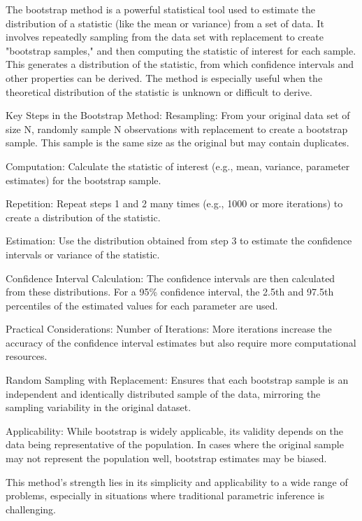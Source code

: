 \documentclass[17pt]{extarticle} %
\begin{document}
The bootstrap method is a powerful statistical tool used to estimate the distribution of a statistic (like the mean or variance) from a set of data. It involves repeatedly sampling from the data set with replacement to create "bootstrap samples," and then computing the statistic of interest for each sample. This generates a distribution of the statistic, from which confidence intervals and other properties can be derived. The method is especially useful when the theoretical distribution of the statistic is unknown or difficult to derive.

Key Steps in the Bootstrap Method:
Resampling: From your original data set of size
N, randomly sample 
N observations with replacement to create a bootstrap sample. This sample is the same size as the original but may contain duplicates.

Computation: Calculate the statistic of interest (e.g., mean, variance, parameter estimates) for the bootstrap sample.

Repetition: Repeat steps 1 and 2 many times (e.g., 1000 or more iterations) to create a distribution of the statistic.

Estimation: Use the distribution obtained from step 3 to estimate the confidence intervals or variance of the statistic.

Confidence Interval Calculation: The confidence intervals are then calculated from these distributions. For a 95\% confidence interval, the 2.5th and 97.5th percentiles of the estimated values for each parameter are used.

Practical Considerations:
Number of Iterations: More iterations increase the accuracy of the confidence interval estimates but also require more computational resources.

Random Sampling with Replacement: Ensures that each bootstrap sample is an independent and identically distributed sample of the data, mirroring the sampling variability in the original dataset.

Applicability: While bootstrap is widely applicable, its validity depends on the data being representative of the population. In cases where the original sample may not represent the population well, bootstrap estimates may be biased.

This method's strength lies in its simplicity and applicability to a wide range of problems, especially in situations where traditional parametric inference is challenging.
\end{document}
